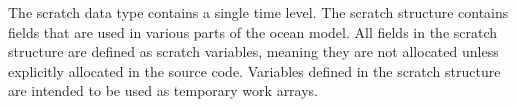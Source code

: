 The scratch data type contains a single time level. The scratch structure
contains fields that are used in various parts of the ocean model. All fields
in the scratch structure are defined as scratch variables, meaning they are not
allocated unless explicitly allocated in the source code. Variables defined in
the scratch structure are intended to be used as temporary work arrays.
